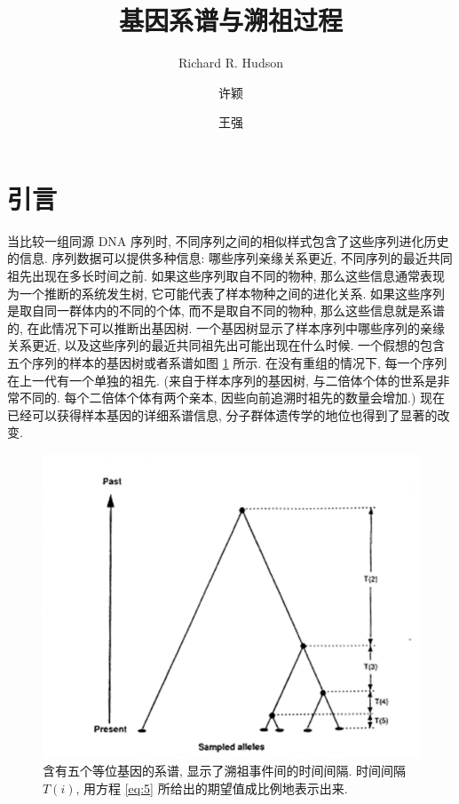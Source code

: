 \documentclass[12pt]{article}
\title{基因系谱与溯祖过程}
\author{Richard R. Hudson \and 许颖 \and 王强}
\institute{University of Chicago \and 南京大学生命科学学院}
\begin{document}
\maketitle

{
    \setcounter{tocdepth}{3}
    \tableofcontents
}

\section{引言}

当比较一组同源 DNA 序列时, 不同序列之间的相似样式包含了这些序列进化历史的信息. 序列数据可以提供多种信息:
哪些序列亲缘关系更近, 不同序列的最近共同祖先出现在多长时间之前. 如果这些序列取自不同的物种,
那么这些信息通常表现为一个推断的系统发生树, 它可能代表了样本物种之间的进化关系.
如果这些序列是取自同一群体内的不同的个体, 而不是取自不同的物种, 那么这些信息就是系谱的,
在此情况下可以推断出基因树. 一个基因树显示了样本序列中哪些序列的亲缘关系更近,
以及这些序列的最近共同祖先出可能出现在什么时候. 一个假想的包含五个序列的样本的基因树或者系谱如图
\ref{fig:1} 所示. 在没有重组的情况下, 每一个序列在上一代有一个单独的祖先. (来自于样本序列的基因树,
与二倍体个体的世系是非常不同的. 每个二倍体个体有两个亲本, 因些向前追溯时祖先的数量会增加.)
现在已经可以获得样本基因的详细系谱信息, 分子群体遗传学的地位也得到了显著的改变.

\begin{figure}
    \centering
    \includegraphics{coalescent-process.images/image1.png}
    \caption{含有五个等位基因的系谱, 显示了溯祖事件间的时间间隔.
        时间间隔 $T(i)$, 用方程 \ref{eq:5} 所给出的期望值成比例地表示出来.}
    \label{fig:1}
\end{figure}
\end{document}
